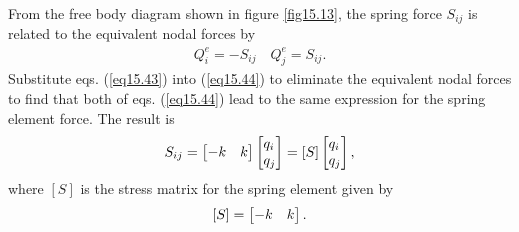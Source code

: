 \documentclass{AeroStructure-ERJohnson}
\begin{document}
From the free body diagram shown in figure \ref{fig15.13}, the spring force $S_{i j}$ is related to the equivalent nodal forces by
\begin{align}\label{eq15.44}
Q_{i}^{e}=-S_{i j} \quad Q_{j}^{e}=S_{i j}.
\end{align}
Substitute eqs. (\ref{eq15.43}) into (\ref{eq15.44}) to eliminate the equivalent nodal forces to find that both of eqs. (\ref{eq15.44}) lead to the same expression for the spring element force. The result is
\begin{align}\label{eq15.45}
S_{i j}=\left[\begin{array}{@{}ll@{}}-k & k\end{array}\right]\left[\begin{array}{@{}l@{}}q_{i} \\q_{j}\end{array}\right]=[S]\left[\begin{array}{@{}l@{}}q_{i} \\q_{j}\end{array}\right],
\end{align}
where $[S]$ is the stress matrix for the spring element given by
\begin{align}\label{eq15.46}
[S]=\left[\begin{array}{@{}ll@{}}-k & k\end{array}\right].
\end{align}
\end{document}
